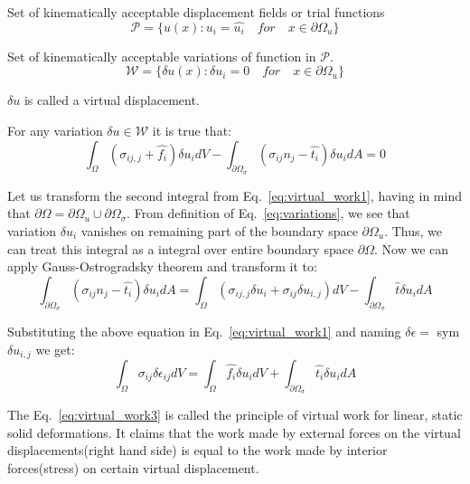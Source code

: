 \documentclass[en]{minipw} %
\begin{document}
Set of kinematically acceptable displacement fields or trial functions
\begin{equation}
\mathcal{P} = \{ u(x) : u_i = \hat{u_i} \quad for \quad x \in \partial \Omega_{u} \}
\end{equation}

Set of kinematically acceptable variations of function in $\mathcal{P}$.
\begin{equation}
\label{eq:variations}
\mathcal{W} = \{ \delta u(x) : \delta u_i = 0 \quad for \quad x \in \partial \Omega_{u} \}
\end{equation}

$\delta u$ is called a virtual displacement. 

For any variation $\delta u \in \mathcal{W}$ it is true that:
\begin{equation}
\label{eq:virtual_work1}
\int_{\Omega}(\sigma_{ij,j} + \hat{f_i}) \delta u_{i} dV - \int_{\partial \Omega_{\sigma}}(\sigma_{ij}n_{j} - \hat{t_{i}}) \delta u_{i}dA = 0
\end{equation}

Let us transform the second integral from Eq.~\ref{eq:virtual_work1}, having in mind that $\partial \Omega = \partial \Omega_{u} \cup \partial \Omega_{\sigma}$. From definition of Eq.~\ref{eq:variations}, we see that variation $\delta u_{i}$ vanishes on remaining part of the boundary space $\partial \Omega_{u}$. Thus, we can treat this integral as a integral over entire boundary space $\partial \Omega$. Now we can apply Gauss-Ostrogradsky theorem and transform it to:
\begin{equation}
\label{eq:virtual_work2}
\int_{\partial \Omega_{\sigma}}(\sigma_{ij}n_{j} - \hat{t_{i}}) \delta u_{i}dA = \int_{\Omega}(\sigma_{ij,j} \delta u_{i} + \sigma_{ij} \delta u_{i,j}) dV - \int_{\partial \Omega_{\sigma}} \hat{t} \delta u_i dA
\end{equation}

Substituting the above equation in Eq.~\ref{eq:virtual_work1} and naming $\delta \epsilon =$ sym $\delta u_{i,j}$ we get:
\begin{equation}
\label{eq:virtual_work3}
\int_{\Omega}\sigma_{ij} \delta \epsilon_{ij} dV = \int_{\Omega} \hat{f_i} \delta u_{i} dV + \int_{\partial \Omega_{\sigma}} \hat{t_i} \delta u_{i} dA
\end{equation}

The Eq.~\ref{eq:virtual_work3} is called the principle of virtual work for linear, static solid deformations. It claims that the work made by external forces on the virtual displacements(right hand side) is equal to the work made by interior forces(stress) on certain virtual displacement.
\end{document}

